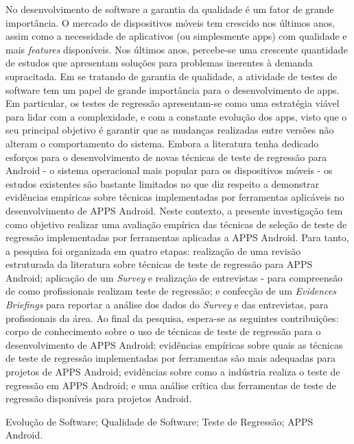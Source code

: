 
\resumo


No desenvolvimento de software a garantia da qualidade é um fator de grande importância. O mercado de dispositivos móveis tem crescido nos últimos anos, assim como a necessidade de aplicativos (ou simplesmente apps) com qualidade e mais \textit{features} disponíveis. Nos últimos anos, percebe-se uma crescente quantidade de estudos que apresentam soluções para problemas inerentes à demanda supracitada. Em se tratando de garantia de qualidade, a atividade de testes de software tem um papel de grande importância para o desenvolvimento de apps. Em particular, os testes de regressão apresentam-se como uma estratégia viável para lidar com a complexidade, e com a constante evolução dos apps, visto que o seu principal objetivo é garantir que as mudanças realizadas entre versões não alteram o comportamento do sistema. Embora a literatura tenha dedicado esforços para o desenvolvimento de novas técnicas de teste de regressão para Android - o sistema operacional mais popular para os dispositivos móveis - os estudos existentes são bastante limitados no que diz respeito a demonstrar evidências empíricas sobre técnicas implementadas por ferramentas aplicáveis no desenvolvimento de \ac{APPS} Android. Neste contexto, a presente investigação tem como objetivo realizar uma avaliação empírica das técnicas de seleção de teste de regressão implementadas por ferramentas aplicadas a \ac{APPS} Android. Para tanto, a pesquisa foi organizada em quatro etapas: realização de uma revisão estruturada da literatura sobre técnicas de teste de regressão para \ac{APPS} Android; aplicação de um \textit{Survey} e realização de entrevistas - para compreensão de como profissionais realizam teste de regressão; e confecção de um \textit{Evidences Briefings} para reportar a análise dos dados do \textit{Survey} e das entrevistas, para profissionais da área. Ao final da pesquisa, espera-se as seguintes contribuições: corpo de conhecimento sobre o uso de técnicas de teste de regressão para o desenvolvimento de \ac {APPS} Android; evidências empíricas sobre quais as técnicas de teste de regressão implementadas por ferramentas são mais adequadas para projetos de \ac{APPS} Android; evidências sobre como a indústria realiza o teste de regressão em \ac{APPS} Android; e uma análise crítica das ferramentas de teste de regressão disponíveis para projetos Android.



\begin{keywords}
Evolução de Software; Qualidade de Software; Teste de Regressão; APPS Android.
\end{keywords}

